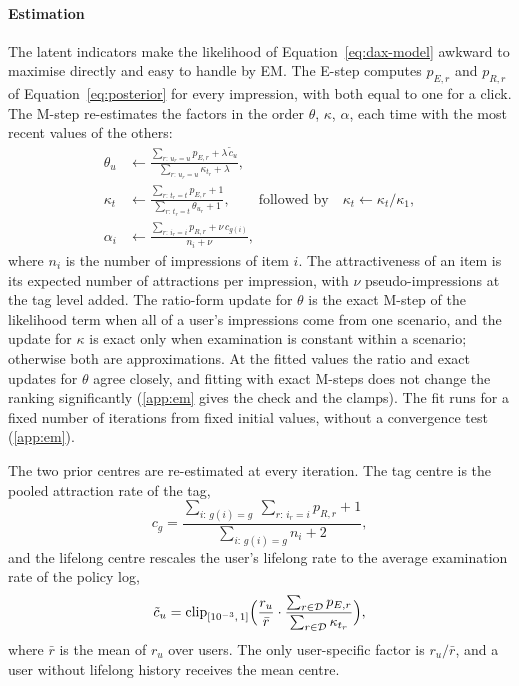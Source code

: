 \documentclass[preprint,12pt,authoryear]{elsarticle}
\begin{document}
\paragraph{Estimation} The latent indicators make the likelihood of Equation~\eqref{eq:dax-model} awkward to maximise directly and easy to
handle by EM. The E-step computes $p_{E,r}$ and $p_{R,r}$ of Equation~\eqref{eq:posterior} for every impression, with both equal to one for a
click. The M-step re-estimates the factors in the order $\theta$, $\kappa$, $\alpha$, each time with the most recent values of the others:
\begin{align}
  \theta_u&\leftarrow\frac{\sum_{r:\,u_r=u}p_{E,r}+\lambda\,\tilde c_u}{\sum_{r:\,u_r=u}\kappa_{t_r}+\lambda},
  \label{eq:m-theta}\\
  \kappa_t&\leftarrow\frac{\sum_{r:\,t_r=t}p_{E,r}+1}{\sum_{r:\,t_r=t}\theta_{u_r}+1},\qquad\text{followed by}\quad
  \kappa_t\leftarrow\kappa_t/\kappa_1,
  \label{eq:m-kappa}\\
  \alpha_i&\leftarrow\frac{\sum_{r:\,i_r=i}p_{R,r}+\nu\,c_{g(i)}}{n_i+\nu},
  \label{eq:m-alpha}
\end{align}
where $n_i$ is the number of impressions of item $i$. The attractiveness of an item is its expected number of attractions per impression,
with $\nu$ pseudo-impressions at the tag level added. The ratio-form update for $\theta$ is the exact M-step of the likelihood term when all of a user's impressions come from one
scenario, and the update for $\kappa$ is exact only when examination is constant within a scenario; otherwise both are approximations.
At the fitted values the ratio and exact updates for $\theta$ agree closely, and fitting with exact M-steps does not change the ranking
significantly (\ref{app:em} gives the check and the clamps). The fit runs for a fixed number of iterations from fixed initial values, without a convergence test (\ref{app:em}).

The two prior centres are re-estimated at every iteration. The tag centre is the pooled attraction rate of the tag,
\begin{equation}
  c_g=\frac{\sum_{i:\,g(i)=g}\ \sum_{r:\,i_r=i}p_{R,r}+1}{\sum_{i:\,g(i)=g}n_i+2},
  \label{eq:tag-centre}
\end{equation}
and the lifelong centre rescales the user's lifelong rate to the average examination rate of the policy log,
\begin{equation}
  \tilde c_u=\operatorname{clip}_{[10^{-3},\,1]}\Bigl(\frac{r_u}{\bar r}\cdot\frac{\sum_{r\in\mathcal D}p_{E,r}}{\sum_{r\in\mathcal D}\kappa_{t_r}}\Bigr),
  \label{eq:life-centre}
\end{equation}
where $\bar r$ is the mean of $r_u$ over users. The only user-specific factor is $r_u/\bar r$, and a user without lifelong history receives the
mean centre.
\end{document}
